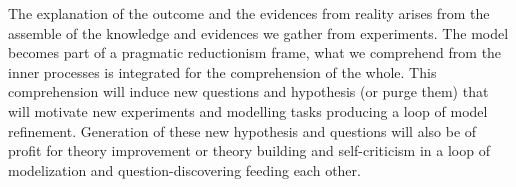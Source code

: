 \documentclass[11pt,oneside,a4paper,openright]{report}
\begin{document}
%
%
%
The explanation of the outcome and the evidences from reality arises from the assemble of the knowledge and evidences we gather from experiments. The model becomes part of a pragmatic reductionism frame, what we comprehend from the inner processes is integrated for the comprehension of the whole. This comprehension will induce new questions and hypothesis (or purge them) that will motivate new experiments and modelling tasks producing a loop of model refinement. Generation of these new hypothesis and questions will also be of profit for theory improvement or theory building and self-criticism in a loop of modelization and question-discovering feeding each other. 

\end{document}
